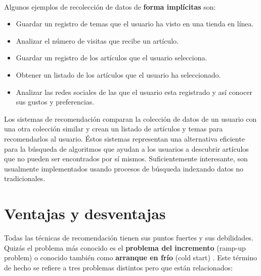 \documentclass[12pt,letterpaper,oneside] {memoir}
\begin{document}
\paragraph{}
Algunos ejemplos de recolección de datos de \textbf{forma implícitas} son:
\begin{itemize}
	\item Guardar un registro de temas que el usuario ha visto en una tienda en línea.
	\item Analizar el número de visitas que recibe un artículo.
	\item Guardar un registro de los artículos que el usuario selecciona.
	\item Obtener un listado de los artículos que el usuario ha seleccionado.
	\item Analizar las redes sociales de las que el usuario esta registrado y así conocer sus gustos y preferencias.
\end{itemize}

Los sistemas de recomendación comparan la colección de datos de un usuario con una otra colección similar y crean un listado de artículos y temas para recomendarlos al usuario. Éstos sistemas representan una alternativa eficiente para la búsqueda de algoritmos que ayudan a los usuarios a descubrir artículos que no pueden ser encontrados por sí mismos. Suficientemente interesante, son usualmente implementados usando procesos de búsqueda indexando datos no tradicionales. 

\section{Ventajas y desventajas}
Todas las técnicas de recomendación tienen sus puntos fuertes y sus debilidades. Quizás el problema más conocido es el \textbf{problema del incremento} (ramp-up problem) o conocido también como \textbf{arranque en frío} (cold start) \citep{Ahn2008, Burke2002}. Este término de hecho se refiere a tres problemas distintos pero que están relacionados:
\end{document}
